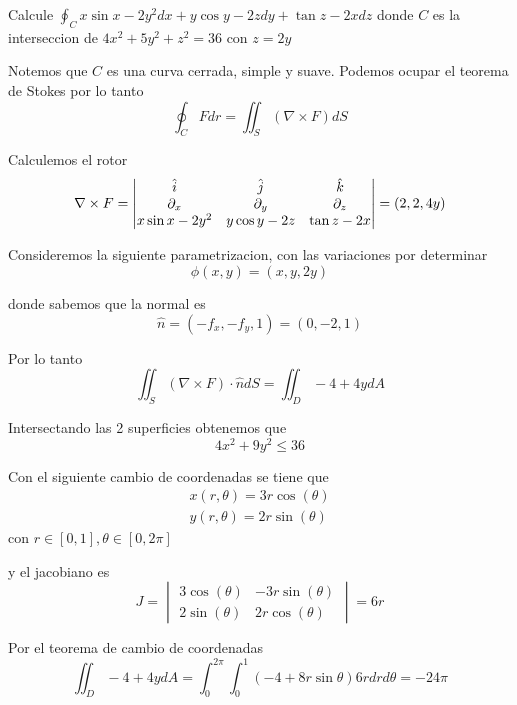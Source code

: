 \documentclass[../main.tex]{subfiles}
\begin{document}
\begin{problem}
Calcule $\oint_{C} x \sin x - 2y^{2} dx + y \cos y - 2z dy + \tan z - 2x dz$ donde $C$ es la interseccion de $4x^{2} + 5y^{2} + z^{2} = 36$ con $z = 2y$
\end{problem}
\begin{solution}
  Notemos que $C$ es una curva cerrada, simple y suave. Podemos ocupar el teorema de Stokes por lo
  tanto
  \begin{equation*}
    \oint_{C} F dr = \iint_{S} (\nabla \times F) dS
  \end{equation*}

  Calculemos el rotor
  \begin{equation*}
    \nabla \times F = \begin{vmatrix} \hat{i} & \hat{j} & \hat{k}\\ \partial_x & \partial_y & \partial_z\\ x \sin x - 2y^{2} & y \cos y - 2z & \tan z - 2x\end{vmatrix} = (2, 2, 4y)
  \end{equation*}

  Consideremos la siguiente parametrizacion, con las variaciones por determinar
  \begin{equation*}
    \phi(x, y) = (x, y, 2y)
  \end{equation*}

  donde sabemos que la normal es
  \begin{equation*}
    \hat{n} = (-f_{x}, -f_{y}, 1) = (0, -2, 1)
  \end{equation*}

  Por lo tanto
  \begin{equation*}
    \iint_{S} (\nabla \times F) \cdot \hat{n} dS = \iint_{D} -4 + 4y dA
  \end{equation*}

  Intersectando las 2 superficies obtenemos que
  \begin{equation*}
    4x^{2} + 9y^{2} \leq 36
  \end{equation*}

  Con el siguiente cambio de coordenadas se tiene que
  \begin{gather*}
    x(r, \theta) = 3 r \cos(\theta)\\
    y(r, \theta) = 2 r \sin(\theta)
  \end{gather*}
  con $r \in [0, 1], \theta \in [0, 2\pi]$

  y el jacobiano es
  \begin{equation*}
    J = \begin{vmatrix}
      3 \cos(\theta) & -3r\sin(\theta)\\
      2 \sin(\theta) & 2r \cos(\theta)
    \end{vmatrix} = 6r
  \end{equation*}

  Por el teorema de cambio de coordenadas
  \begin{equation*}
    \iint_{D} -4 + 4y dA = \int_{0}^{2\pi}\int_{0}^{1} (-4 + 8r \sin\theta)6r dr d\theta = -24\pi
  \end{equation*}

\end{solution}
\end{document}
